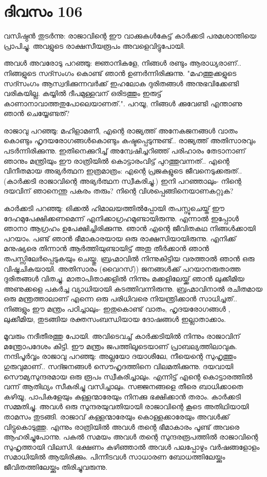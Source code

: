  
\section{ദിവസം 106}


വസിഷ്ഠന്‍ തുടര്‍ന്നു: രാജാവിന്റെ ഈ വാക്കുകള്‍കേട്ട്‌ കാര്‍ക്കടി പരമശാന്തിയെ പ്രാപിച്ചു. അവളുടെ രാക്ഷസീയരൂപം അവളെവിട്ടുപോയി.

അവള്‍ അവരോടു പറഞ്ഞു: ജ്ഞാനികളേ, നിങ്ങള്‍ രണ്ടും ആരാധ്യരാണ്‌.. നിങ്ങളുടെ സദ്സംഗം കൊണ്ട്‌ ഞാന്‍ ഉണര്‍ന്നിരിക്കുന്നു. "മഹത്തുക്കളുടെ സദ്സംഗം ആസ്വദിക്കുന്നവര്‍ക്ക്‌ ഇഹലോക ദുരിതങ്ങള്‍ അനുഭവിക്കേണ്ടി വരികയില്ല. കയ്യില്‍ ദീപമുള്ളവന്‌ ഒരിടത്തും ഇരുട്ട്‌ കാണാനാവാത്തതുപോലെയാണത്‌.". പറയൂ, നിങ്ങള്‍ ക്കുവേണ്ടി എന്താണു ഞാന്‍ ചെയ്യേണ്ടത്‌?

രാജാവു പറഞ്ഞു: മഹിളാമണീ, എന്റെ രാജ്യത്ത്‌ അനേകജനങ്ങള്‍ വാതം കൊണ്ടും ഹൃദയരോഗങ്ങള്‍കൊണ്ടും കഷ്ടപ്പെടുന്നുണ്ട്‌.. രാജ്യത്ത്‌ അതിസാരവും പടര്‍ന്നിരിക്കുന്നു. ഇതിനെക്കുറിച്ച്‌ അന്വേഷിച്ചറിഞ്ഞ്‌ പരിഹാരം തേടാനാണ്‌ ഞാനും മന്ത്രിയും ഈ രാത്രിയില്‍ കൊട്ടാരംവിട്ട്‌ പുറത്തുവന്നത്‌.. എന്റെ വിനീതമായ അഭ്യര്‍ത്ഥന ഇത്രമാത്രം: എന്റെ പ്രജകളുടെ ജീവനെടുക്കരുത്‌.. (കാര്‍ക്കടി രാജാവിന്റെ അഭ്യര്‍ത്ഥന സ്വീകരിച്ചു.) ഇനി പറഞ്ഞാലും- നിന്റെ ദയവിന്‌ ഞാനെന്തു പകരം തരും? നിന്റെ വിശപ്പെങ്ങിനെയാണകറ്റുക?

കാര്‍ക്കടി പറഞ്ഞു: ഒിക്കല്‍ ഹിമാലയത്തില്‍പ്പോയി തപസ്സുചെയ്ത്‌ ഈ ദേഹമുപേക്ഷിക്കണമെന്ന് എനിക്കാഗ്രഹമുണ്ടായിരുന്നു. എന്നാല്‍ ഇപ്പോള്‍ ഞാനാ ആഗ്രഹം ഉപേക്ഷിച്ചിരിക്കുന്നു. ഞാന്‍ എന്റെ ജീവിതകഥ നിങ്ങള്‍ക്കായി പറയാം. പണ്ട്‌ ഞാന്‍ ഭീമാകാരയായ ഒരു രാക്ഷസിയായിരുന്നു. എനിക്ക്‌ മനുഷ്യരെ തിന്നാന്‍ ആര്‍ത്തിയുണ്ടായിട്ട്‌ അതു തീര്‍ക്കാന്‍ ഞാന്‍ തപസ്സിലേര്‍പ്പെടുകയും ചെയ്തു. ബ്രഹ്മാവില്‍ നിന്നുകിട്ടിയ വരത്താല്‍ ഞാന്‍ ഒരു വിഷൂചികയായി. അതിസാരം (വൈറസ്‌)) ജനങ്ങള്‍ക്ക്‌ പറയാനരുതാത്ത ദുരിതങ്ങള്‍ വിതച്ചു. മാതാപിതാക്കളില്‍ നിന്നും മക്കളിലേയ്ക്ക്‌ ഞാന്‍ ലുക്കീമിയ അണുക്കളെ പകര്‍ച്ച വ്യാധിയായി കടത്തിവന്നിരുന്നു. ബ്രഹ്മാവിനാല്‍ രചിതമായ ഒരു മന്ത്രത്താലാണ്‌ എന്നെ ഒരു പരിധിവരെ നിയന്ത്രിക്കാന്‍ സാധിച്ചത്‌.. നിങ്ങളും ഈ മന്ത്രം പഠിച്ചാലും- ഇതുകൊണ്ട്‌ വാതം, ഹൃദയരോഗങ്ങള്‍ , ലുക്കീമിയ, തുടങ്ങിയ രക്തസംബന്ധിയായ ദോഷങ്ങള്‍ ഇല്ലാതാക്കാം.

മൂവരും നദീതീരത്തു പോയി. അവിടെവച്ച്‌ കാര്‍ക്കടിയില്‍ നിന്നും രാജാവിന്‌ മന്ത്രോപദേശം കിട്ടി. ഈ മന്ത്രം ജപത്തിലൂടെയാണ്‌ പ്രാബല്യത്തിലാവുക. നന്ദിപൂര്‍വ്വം രാജാവു പറഞ്ഞു: അല്ലയോ ദയാശീലേ, നീയെന്റെ സുഹൃത്തും ഗുരുവുമാണ്‌.. സദ്ജനങ്ങള്‍ സൌഹൃദത്തിനെ വിലമതിക്കുന്നു. ദയവായി സൌമ്യസുന്ദരമായ ഒരു രൂപം സ്വീകരിച്ചാലും. എന്നിട്ട്‌ എന്റെ കൊട്ടാരത്തില്‍ വന്ന് ആതിഥ്യം സീകരിച്ചു വസിച്ചാലും. സജ്ജനങ്ങളെ തീരെ ബാധിക്കാതെ കഴിയൂ, പാപികളേയും കള്ളന്മാരേയും നിനക്കു ഭക്ഷിക്കാന്‍ തരാം. കാര്‍ക്കടി സമ്മതിച്ചു. അവള്‍ ഒരു സുന്ദരയുവതിയായി രാജാവിന്റെ കൂടെ അതിഥിയായി താമസം തുടങ്ങി. രാജാവ്‌ കള്ളന്മാരേയും കൊള്ളക്കാരേയും അവള്‍ക്ക്‌ വിട്ടുകൊടുത്തു. എന്നും രാത്രിയില്‍ അവള്‍ തന്റെ ഭീമാകാരം പൂണ്ട്‌ അവരെ ആഹരിച്ചുപോന്നു. പകല്‍ സമയം അവള്‍ തന്റെ സുന്ദരരൂപത്തില്‍ രാജാവിന്റെ സുഹൃത്തായി വിലസി. ഭക്ഷണം കഴിഞ്ഞാല്‍ അവള്‍ പലപ്പോഴും വര്‍ഷങ്ങളോളം സമാധിയില്‍ ആയിരിക്കും. പിന്നീടവള്‍ സാധാരണ ബോധത്തിലേയ്ക്കും ജീവിതത്തിലേയ്ക്കും തിരിച്ചുവരുന്നു. 


